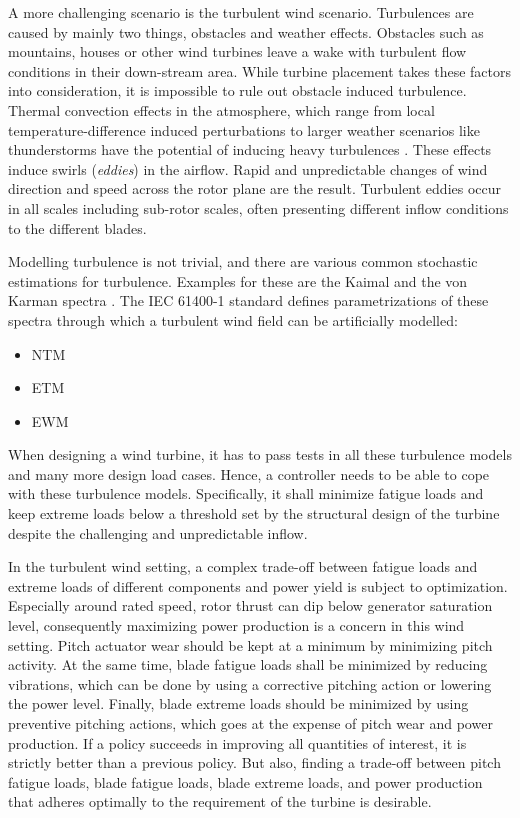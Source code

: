 A more challenging scenario is the turbulent wind scenario. Turbulences are caused by mainly two things, obstacles and weather effects. Obstacles such as mountains, houses or other wind turbines leave a wake with turbulent flow conditions in their down-stream area. While turbine placement takes these factors into consideration, it is impossible to rule out obstacle induced turbulence. Thermal convection effects in the atmosphere, which range from local temperature-difference induced perturbations to larger weather scenarios like thunderstorms have the potential of inducing heavy turbulences \cite[Chapter 2.6.1]{burtonWindEnergyHandbook2011}. These effects induce swirls (\textit{eddies}) in the airflow. Rapid and unpredictable changes of wind direction and speed across the rotor plane are the result. Turbulent eddies occur in all scales including sub-rotor scales, often presenting different inflow conditions to the different blades. 

Modelling turbulence is not trivial, and there are various common stochastic estimations for turbulence. Examples for these are the Kaimal and the von Karman spectra \cite[Section 2.6.4]{burtonWindEnergyHandbook2011}. The IEC 61400-1 standard \cite{internationalelectrotechnicalcommissionIEC61400120192019} defines parametrizations of these spectra through which a turbulent wind field can be artificially modelled:

\begin{itemize}
  \item \acf{NTM}
  \item \acf{ETM}
  \item \acf{EWM}
\end{itemize}

When designing a wind turbine, it has to pass tests in all these turbulence models and many more design load cases. Hence, a controller needs to be able to cope with these turbulence models. Specifically, it shall minimize fatigue loads and keep extreme loads below a threshold set by the structural design of the turbine despite the challenging and unpredictable inflow.

In the turbulent wind setting, a complex trade-off between fatigue loads and extreme loads of different components and power yield is subject to optimization. Especially around rated speed, rotor thrust can dip below generator saturation level, consequently maximizing power production is a concern in this wind setting. Pitch actuator wear should be kept at a minimum by minimizing pitch activity. At the same time, blade fatigue loads shall be minimized by reducing vibrations, which can be done by using a corrective pitching action or lowering the power level. Finally, blade extreme loads should be minimized by using preventive pitching actions, which goes at the expense of pitch wear and power production. If a policy succeeds in improving all quantities of interest, it is strictly better than a previous policy. But also, finding a trade-off between pitch fatigue loads, blade fatigue loads, blade extreme loads, and power production that adheres optimally to the requirement of the turbine is desirable.



